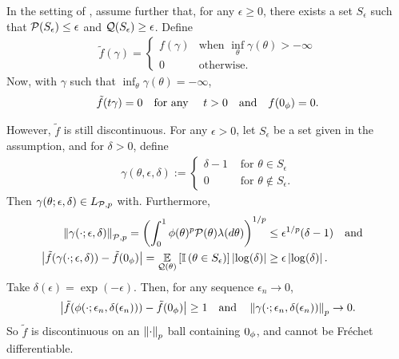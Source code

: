 \begin{ex}
%
In the setting of , assume further that, for any
$\epsilon \ge 0$, there exists a set $S_\epsilon$ such that $\mathcal{P}(S_\epsilon) \le
\epsilon$ and $\mathcal{Q}(S_\epsilon) \ge \epsilon$.  Define
%
\begin{align*}
%
\tilde{f}(\gamma) = \begin{cases}
    f(\gamma) & \textrm{when }\inf_\theta \gamma(\theta) > -\infty \\
    0 & \textrm{otherwise}.
\end{cases}
%
\end{align*}
%
Now, with $\gamma$ such that $\inf_\theta \gamma(\theta) = -\infty$,
%
\begin{align*}
%
\tilde{f}(\t \gamma) = 0 \mathtxt{for any }\t > 0 \mathtxt{and} f(\phiz) = 0.
%
\end{align*}

However, $\tilde{f}$ is still discontinuous.  For any $\epsilon > 0$, let
$S_\epsilon$ be a set given in the assumption, and for $\delta > 0$, define
%
\begin{align*}
%
\gamma(\theta, \epsilon, \delta) :=
\begin{cases}
    \delta - 1      & \textrm{ for }\theta\in S_\epsilon \\
    0      & \textrm{ for }\theta\notin S_\epsilon.
\end{cases}
%
\end{align*}
%
Then $\gamma(\theta; \epsilon, \delta) \in {L_{\mathcal{P},p}}$ with.  Furthermore,
%
\begin{align*}
%
\norm{\gamma(\cdot;
\epsilon, \delta)}_{\p,p} =
    \left( \int_0^1 \phi(\theta)^p \p(\theta
)\lambda(d\theta)\right)^{1/p} \le{}& \epsilon^{1/p} (\delta - 1)  \mathand\\
%
\abs{\tilde{f}(\gamma(\cdot; \epsilon, \delta)) - \tilde{f}(\phiz)} =
    \expect{\q(\theta)}{\ind{\theta \in S_\epsilon}} \abs{\log(\delta)} \ge{}&
    \epsilon \abs{\log(\delta)}.
%
\end{align*}
Take $\delta(\epsilon) = \exp(-\epsilon)$.  Then, for any sequence $\epsilon_n
\rightarrow 0$,
%
\begin{align*}
%
\abs{\tilde{f}(\phi(\cdot; \epsilon_n, \delta(\epsilon_n))) -
     \tilde{f}(\phiz)} \ge{} 1
\mathtxt{and}
\norm{\gamma(\cdot; \epsilon_n, \delta(\epsilon_n))}_p \rightarrow{} 0.
%
\end{align*}
%
So $\tilde{f}$ is discontinuous on an $\left\Vert\cdot\right\Vert_p$ ball containing $0_\phi$,
and cannot be Fr{\'e}chet differentiable.
%
\end{ex}
